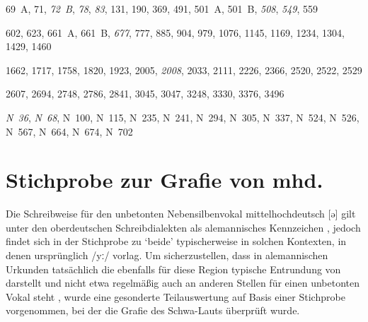 {%
\setlength{\columnsep}{35pt} %
\raggedright
\begin{multicols}{2}
\begin{description}[font=\normalfont,labelsep=\fontdimen2\font]
\item[\cite{cao1},] 69~A, 71, \emph{72~B}, \emph{78}, \emph{83}, 131, 190, 369,
491, 501~A, 501~B, \emph{508}, \emph{549}, 559

\item[\cite{cao2},] 602, 623, 661~A, 661~B, \emph{677}, 777, 885, 904, 979,
1076, 1145, 1169, 1234, 1304, 1429, 1460

\item[\cite{cao3},] 1662, 1717, 1758, 1820, 1923, 2005, \emph{2008}, 2033, 2111,
2226, 2366, 2520, 2522, 2529

\item[\cite{cao4},] 2607, 2694, 2748, 2786, 2841, 3045, 3047, 3248, 3330, 3376,
3496

\item[\cite{cao5},] \emph{N~36}, \emph{N~68}, N~100, N~115, N~235, N~241, N~294,
N~305, N~337, N~524, N~526, N~567, N~664, N~674, N~702
\end{description}
\end{multicols}
}


\chapter{Stichprobe zur Grafie von mhd.\ }
\label{sec:caoalemschwa}

Die Schreibweise  für den unbetonten Nebensilbenvokal mittelhochdeutsch
 [ə] gilt unter den ober\-deutschen Schreibdialekten als alemannisches
Kennzeichen \autocites[vgl.][25]{weinhold1863}[75]{weinhold1883}[41,
113]{paul2007}, jedoch findet sich  in der Stichprobe zu 
`beide' typischerweise in solchen Kontexten, in denen ursprünglich 
/yː/ vorlag. Um sicherzustellen, dass  in alemannischen Urkunden
tatsächlich die ebenfalls für diese Region typische Entrundung von 
darstellt und nicht etwa regelmäßig auch an anderen Stellen für einen
unbetonten Vokal steht
\autocites%
	[466--467]{schirmunski1962}%
	[41]{paul2007}%
	[305]{ksw2}%
	[vgl.~auch][131--132]{boesch1946}%
, wurde eine gesonderte Teilauswertung auf Basis einer Stichprobe vorgenommen,
bei der die Grafie des Schwa-Lauts überprüft wurde.

